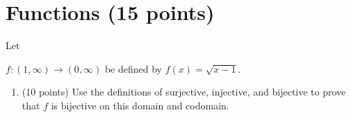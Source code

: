 \documentclass[11pt]{article}
\def\sectionOneA#1{}
\def\sectionOneB#1{}
\def\sectionTwoA#1{#1}
\def\sectionTwoB#1{}
\def\sectionVicsection#1{}
\newcounter{pgpts}
\begin{document}
\section{Functions (15 points)}\addtocounter{pgpts}{15}


Let
\sectionOneA{ $f:\mathbb{R}^+\to\mathbb{R}^+$ be defined by $f(x)=\frac{1}{x^2}$\;.}
\sectionOneB{$f(x)=\frac{x-1}{2}$\;.} %
\sectionTwoA{$f:(1,\infty) \to (0,\infty)$ be defined by $f(x)=\sqrt{x-1}$\;.}
\sectionTwoB{$f(x)=2x+5$\;.} %
\sectionVicsection{$f(x)=7x-\frac{1}{2}$\;.}
  \begin{enumerate}
    \item (10 points) Use the definitions of surjective, injective, and bijective to prove that $f$ is bijective on this domain and codomain.
    \sectionOneA{
\begin{enumerate}
    \item Surjective: The function $f:\mathbb{R}^+ \to \mathbb{R}^+$ is surjective if $\forall y\in \mathbb{R}^+, \exists x\in \mathbb{R}^+$ such that $f(x)=y$. To check that this is satisfied, let $y\in \mathbb{R}^+$. Define $x$ by $x=\frac{1}{\sqrt{y}}$, and note that $x$ is well-defined because $y>0$. Also note that $x\in \mathbb{R}^+$ because $\mathbb{R^+}$ is closed under taking roots and reciprocals. Observe that 
    \begin{align*}
    f(x)=\frac{1}{x^2}=\frac{1}{(\frac{1}{\sqrt{y}})^2} = \frac{1}{\frac{1}{(\sqrt{y})^2 }}= \frac{1}{\frac{1}{y}}=y,
    \end{align*} so we have found a particular $x\in \mathbb{R}^+$ such that $f(x)=y$. Since $y$ was arbitrary, this shows that every element $y\in \mathbb{R}^+$ has a preimage in $\mathbb{R}^+$, so $f$ is surjective.
    \item Injective: The function $f:\mathbb{R}^+\to \mathbb{R}^+$ is injective if $\forall x_1,x_2\in \mathbb{R}^+, f(x_1)=f(x_2) \rightarrow x_1 =x_2$.
    Suppose $x_1,x_2\in \mathbb{R}^+$ are such that $f(x_1)=f(x_2)$. Then
    \begin{align*}
        \frac{1}{x_1^2}&=\frac{1}{x_2^2} &\text{Definition of $f$}\\
        x_2^2 &= x_1^2 &\text{Multiplying through by $x_1x_2$}\\
        x_2 &= \pm x_1 &\text{Algebra}\\
        x_2 &= x_1 &\text{$x_1,x_2\in \mathbb{R}^+$}
    \end{align*}
\item Bijective: $f$ is bijective if it is both surjective and injective. We have proven that $f$ is surjective and injective, so we have proven that $f$ is bjective.

\end{enumerate}}
\end{enumerate}
\end{document}
